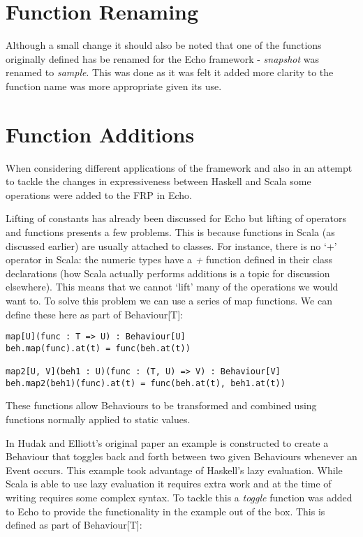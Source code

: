   \section{Function Renaming}
    Although a small change it should also be noted that one of the functions originally defined
    has be renamed for the Echo framework - \emph{snapshot} was renamed to \emph{sample}. This was done as
    it was felt it added more clarity to the function name was more appropriate given its use.
    
  \section{Function Additions}
    When considering different applications of the framework and also in an attempt to
    tackle the changes in expressiveness between Haskell and Scala some operations
    were added to the FRP in Echo.
    
    Lifting of constants has already been discussed for Echo but lifting of operators and
    functions presents a few problems. This is because functions in Scala (as discussed earlier)
    are usually attached to classes. For instance, there is no `+' operator in Scala: the numeric
    types have a \emph{+} function defined in their class declarations (how Scala actually performs additions
    is a topic for discussion elsewhere). This means that we cannot `lift' many of the operations we
    would want to. To solve this problem we can use a series of map functions. We can define these
    here as part of Behaviour[T]:

\begin{verbatim}
map[U](func : T => U) : Behaviour[U]
beh.map(func).at(t) = func(beh.at(t))

map2[U, V](beh1 : U)(func : (T, U) => V) : Behaviour[V]
beh.map2(beh1)(func).at(t) = func(beh.at(t), beh1.at(t))
\end{verbatim}        

    These functions allow Behaviours to be transformed and combined using functions
    normally applied to static values.
    
    In Hudak and Elliott's original paper an example is constructed to create a Behaviour
    that toggles back and forth between two given Behaviours whenever an Event occurs. This
    example took advantage of Haskell's lazy evaluation. While Scala is able to use lazy evaluation
    it requires extra work and at the time of writing requires some complex syntax. To tackle this
    a \emph{toggle} function was added to Echo to provide the functionality in the example out of the box.
    This is defined as part of Behaviour[T]:
    

